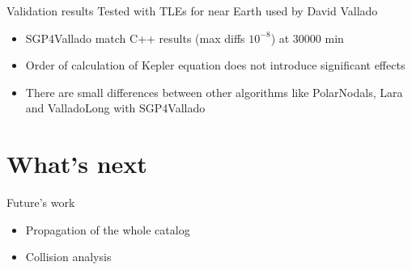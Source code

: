 \documentclass[10pt, compress, xcolor={usenames,dvipsnames}]{beamer}
\newcommand{\SmallArrow}{\ding{228}}
\begin{document}
\begin{frame}[fragile]{Validation results}
Tested with TLEs for near Earth used by David Vallado
  \begin{itemize}[label=\SmallArrow]
    \item SGP4Vallado match C++ results (max diffs $10^{-8}$) at 30000 min
    \item Order of calculation of Kepler equation does not introduce significant effects
    \item There are small differences between other algorithms like PolarNodals, Lara and ValladoLong with SGP4Vallado
  \end{itemize}
\end{frame}

\section{What's next}

\begin{frame}[fragile]{Future's work}
  \begin{itemize}[label=\SmallArrow]
    \item Propagation of the whole catalog
    \item Collision analysis
  \end{itemize}
\end{frame}

\end{document}

